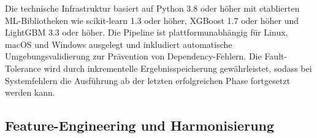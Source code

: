\documentclass[11pt,a4paper]{article}
\begin{document}
    Die technische Infrastruktur basiert auf Python 3.8 oder höher mit etablierten ML-Bibliotheken wie scikit-learn 1.3 oder höher, XGBoost 1.7 oder höher und LightGBM 3.3 oder höher. Die Pipeline ist plattformunabhängig für Linux, macOS und Windows ausgelegt und inkludiert automatische Umgebungsvalidierung zur Prävention von Dependency-Fehlern. Die Fault-Tolerance wird durch inkrementelle Ergebnisspeicherung gewährleistet, sodass bei Systemfehlern die Ausführung ab der letzten erfolgreichen Phase fortgesetzt werden kann.

    \subsection{Feature-Engineering und Harmonisierung}
\end{document}

